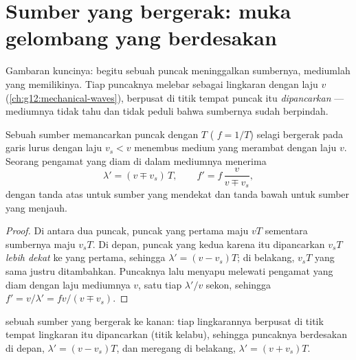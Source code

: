 \section{Sumber yang bergerak: muka gelombang yang berdesakan}

Gambaran kuncinya: begitu sebuah puncak meninggalkan sumbernya, mediumlah yang memilikinya.
Tiap puncaknya melebar sebagai lingkaran dengan laju  $v$
(\cref{ch:g12:mechanical-waves}), berpusat di titik tempat puncak itu \emph{dipancarkan}
--- mediumnya tidak tahu dan tidak peduli bahwa sumbernya sudah berpindah.

\begin{proposition}\label{prop:g12:doppler-effect:moving-source}
Sebuah sumber memancarkan puncak dengan  $T$ ( $f = 1/T$) selagi
bergerak pada garis lurus dengan laju $v_s < v$ menembus medium yang 
merambat dengan laju $v$. Seorang pengamat yang diam di dalam mediumnya menerima
\[
\lambda' = (v \mp v_s)\,T, \qquad f' = f\,\frac{v}{v \mp v_s},
\]
dengan tanda atas untuk sumber yang mendekat dan tanda bawah untuk sumber yang menjauh.
\end{proposition}

\begin{proof}
Di antara dua puncak, puncak yang pertama maju $vT$ sementara sumbernya maju $v_s T$. Di
depan, puncak yang kedua karena itu dipancarkan $v_s T$ \emph{lebih dekat} ke yang
pertama, sehingga $\lambda' = (v - v_s)T$; di belakang, $v_s T$ yang sama justru
ditambahkan. Puncaknya lalu menyapu melewati pengamat yang diam dengan laju mediumnya $v$,
satu tiap $\lambda'/v$ sekon, sehingga $f' = v/\lambda' = f v/(v \mp v_s)$.
\end{proof}

\begin{omfigure}

{\small {} sebuah sumber yang bergerak ke kanan: tiap lingkarannya berpusat di
titik tempat lingkaran itu dipancarkan (titik kelabu), sehingga puncaknya berdesakan di
depan, $\lambda' = (v - v_s)T$, dan meregang di belakang, $\lambda' = (v + v_s)T$.}
\end{omfigure}

